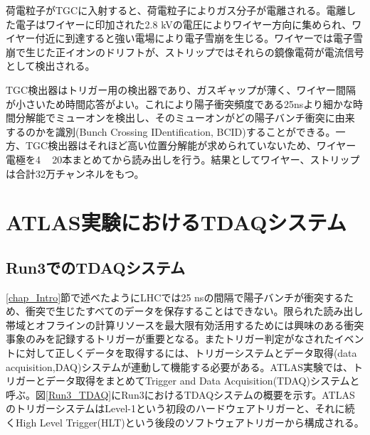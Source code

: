 荷電粒子がTGCに入射すると、荷電粒子によりガス分子が電離される。電離した電子はワイヤーに印加された2.8 kVの電圧によりワイヤー方向に集められ、ワイヤー付近に到達すると強い電場により電子雪崩を生じる。ワイヤーでは電子雪崩で生じた正イオンのドリフトが、ストリップではそれらの鏡像電荷が電流信号として検出される。

TGC検出器はトリガー用の検出器であり、ガスギャップが薄く、ワイヤー間隔が小さいため時間応答がよい。これにより陽子衝突頻度である25nsより細かな時間分解能でミューオンを検出し、そのミューオンがどの陽子バンチ衝突に由来するのかを識別(Bunch Crossing IDentification, BCID)することができる。一方、TGC検出器はそれほど高い位置分解能が求められていないため、ワイヤー電極を4 ~ 20本まとめてから読み出しを行う。結果としてワイヤー、ストリップは合計32万チャンネルをもつ。


\section{ATLAS実験におけるTDAQシステム}
\label{sec_TDAQ}

\subsection{Run3でのTDAQシステム}
\label{subsec_run3TDAQ}
\ref{chap_Intro}節で述べたようにLHCでは25 nsの間隔で陽子バンチが衝突するため、衝突で生じたすべてのデータを保存することはできない。限られた読み出し帯域とオフラインの計算リソースを最大限有効活用するためには興味のある衝突事象のみを記録するトリガーが重要となる。またトリガー判定がなされたイベントに対して正しくデータを取得するには、トリガーシステムとデータ取得(data acquisition,DAQ)システムが連動して機能する必要がある。ATLAS実験では、トリガーとデータ取得をまとめてTrigger and Data Acquisition(TDAQ)システムと呼ぶ。図\ref{Run3_TDAQ}にRun3におけるTDAQシステムの概要を示す。ATLASのトリガーシステムはLevel-1という初段のハードウェアトリガーと、それに続くHigh Level Trigger(HLT)という後段のソフトウェアトリガーから構成される。

